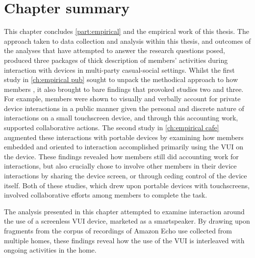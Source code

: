 \crpagebreak\section{Chapter summary}\label{sec:empirical home summary}
This chapter concludes \autoref{part:empirical} and the empirical work of this thesis.
The approach taken to data collection and analysis within this thesis, and outcomes of the analyses that have attempted to answer the research questions posed, produced three packages of thick description of members' activities during interaction with devices in multi-party casual-social settings.
Whilst the first study in \autoref{ch:empirical pub} sought to unpack the methodical approach to how members , it also brought to bare findings that provoked studies two and three.
For example, members were shown to visually and verbally account for private device interactions in a public manner given the personal and discrete nature of interactions on a small touchscreen device, and through this accounting work, supported collaborative actions.
The second study in \autoref{ch:empirical cafe} augmented these interactions with portable devices by examining how members embedded and oriented to interaction accomplished primarily using the \ac{VUI} on the device.
These findings revealed how members still did accounting work for interactions, but also crucially chose to involve other members in their device interactions by sharing the device screen, or through ceding control of the device itself.
Both of these studies, which drew upon portable devices with touchscreens, involved collaborative efforts among members to complete the task.%

The analysis presented in this chapter attempted to examine interaction around the use of a screenless \ac{VUI} device, marketed as a smartspeaker.
By drawing upon fragments from the corpus of recordings of Amazon Echo use collected from multiple homes, these findings reveal how the use of the \ac{VUI} is interleaved with ongoing activities in the home.

